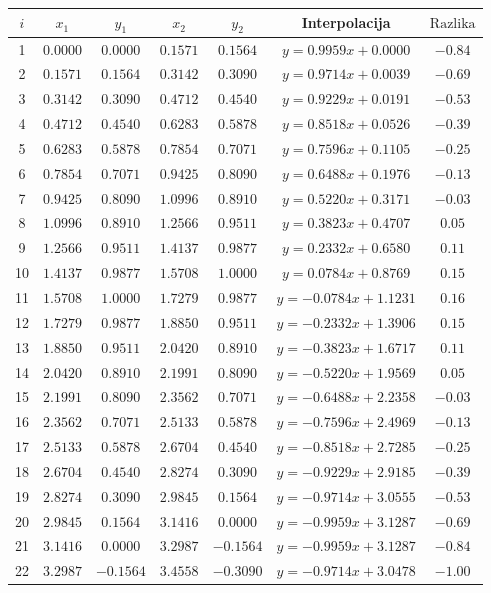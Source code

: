 \documentclass[12pt,a4paper]{report}
\begin{document}
		\begin{table}
		\begin{tabular}{c | c c | c c | c | c}
			$i$&$x_1$&$y_1$&$x_2$&$y_2$&Interpolacija&$\text{Razlika}$\\\hline
1 &$0.0000$&$0.0000$&$0.1571$&$0.1564$&$y =  0.9959x+0.0000$&$-0.84$\\
2 &$0.1571$&$0.1564$&$0.3142$&$0.3090$&$y =  0.9714x+0.0039$&$-0.69$\\
3 &$0.3142$&$0.3090$&$0.4712$&$0.4540$&$y =  0.9229x+0.0191$&$-0.53$\\
4 &$0.4712$&$0.4540$&$0.6283$&$0.5878$&$y =  0.8518x+0.0526$&$-0.39$\\
5 &$0.6283$&$0.5878$&$0.7854$&$0.7071$&$y =  0.7596x+0.1105$&$-0.25$\\
6 &$0.7854$&$0.7071$&$0.9425$&$0.8090$&$y =  0.6488x+0.1976$&$-0.13$\\
7 &$0.9425$&$0.8090$&$1.0996$&$0.8910$&$y =  0.5220x+0.3171$&$-0.03$\\
8 &$1.0996$&$0.8910$&$1.2566$&$0.9511$&$y =  0.3823x+0.4707$&$0.05$\\
9 &$1.2566$&$0.9511$&$1.4137$&$0.9877$&$y =  0.2332x+0.6580$&$0.11$\\
10 &$1.4137$&$0.9877$&$1.5708$&$1.0000$&$y =  0.0784x+0.8769$&$0.15$\\
11 &$1.5708$&$1.0000$&$1.7279$&$0.9877$&$y = -0.0784x+1.1231$&$0.16$\\
12 &$1.7279$&$0.9877$&$1.8850$&$0.9511$&$y = -0.2332x+1.3906$&$0.15$\\
13 &$1.8850$&$0.9511$&$2.0420$&$0.8910$&$y = -0.3823x+1.6717$&$0.11$\\
14 &$2.0420$&$0.8910$&$2.1991$&$0.8090$&$y = -0.5220x+1.9569$&$0.05$\\
15 &$2.1991$&$0.8090$&$2.3562$&$0.7071$&$y = -0.6488x+2.2358$&$-0.03$\\
16 &$2.3562$&$0.7071$&$2.5133$&$0.5878$&$y = -0.7596x+2.4969$&$-0.13$\\
17 &$2.5133$&$0.5878$&$2.6704$&$0.4540$&$y = -0.8518x+2.7285$&$-0.25$\\
18 &$2.6704$&$0.4540$&$2.8274$&$0.3090$&$y = -0.9229x+2.9185$&$-0.39$\\
19 &$2.8274$&$0.3090$&$2.9845$&$0.1564$&$y = -0.9714x+3.0555$&$-0.53$\\
20 &$2.9845$&$0.1564$&$3.1416$&$0.0000$&$y = -0.9959x+3.1287$&$-0.69$\\
21 &$3.1416$&$0.0000$&$3.2987$&$-0.1564$&$y = -0.9959x+3.1287$&$-0.84$\\
22 &$3.2987$&$-0.1564$&$3.4558$&$-0.3090$&$y = -0.9714x+3.0478$&$-1.00$\\

\end{tabular}
\end{table}
\end{document}
